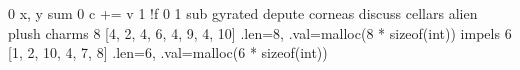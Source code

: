 \expandafter\def\csname cpp:swap\endcsname{0}
\expandafter\def\csname cpp:PARAM(x,y)\endcsname{x, y}
\expandafter\def\csname cpp:comp\endcsname{sum}
\expandafter\def\csname cpp:INIT\endcsname{0}
\expandafter\def\csname cpp:PROCESS(c,v)\endcsname{c += v}
\expandafter\def\csname cpp:NOT\endcsname{1}
\expandafter\def\csname cpp:COND(f,c,v)\endcsname{!f}
\expandafter\def\csname cpp:FALSE\endcsname{0}
\expandafter\def\csname cpp:TRUE\endcsname{1}
\expandafter\def\csname cpp:join\endcsname{sub}
\expandafter\def\csname cpp:FORALLIN\endcsname{gyrated}
\expandafter\def\csname cpp:A\endcsname{depute}
\expandafter\def\csname cpp:B\endcsname{corneas}
\expandafter\def\csname cpp:C\endcsname{discuss}
\expandafter\def\csname cpp:I\endcsname{cellars}
\expandafter\def\csname cpp:J\endcsname{alien}
\expandafter\def\csname cpp:F\endcsname{plush}
\expandafter\def\csname cpp:U\endcsname{charms}
\expandafter\def\csname cpp:TABU_LEN\endcsname{8}
\expandafter\def\csname cpp:TABU_VAL\endcsname{[4, 2, 4, 6, 4, 9, 4, 10]}
\expandafter\def\csname cpp:TABU\endcsname{{.len=8, .val=malloc(8 * sizeof(int))}}
\expandafter\def\csname cpp:V\endcsname{impels}
\expandafter\def\csname cpp:TABV_LEN\endcsname{6}
\expandafter\def\csname cpp:TABV_VAL\endcsname{[1, 2, 10, 4, 7, 8]}
\expandafter\def\csname cpp:TABV\endcsname{{.len=6, .val=malloc(6 * sizeof(int))}}

\def\C#1{\csname cpp:#1\endcsname}

